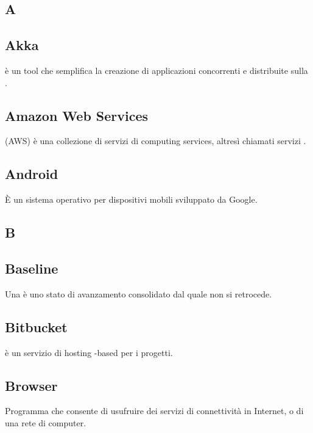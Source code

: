 \newpage

\begin{center}
\Huge\section*{\uppercase{A}}
\end{center}

\subsection*{Akka}
 è un tool  che semplifica la creazione di applicazioni concorrenti e distribuite sulla .

\subsection*{Amazon Web Services}
 (AWS) è una collezione di servizi di  computing services, altresì chiamati servizi .

\subsection*{Android}
È un sistema operativo  per dispositivi mobili sviluppato da Google.

\newpage

\begin{center}
\Huge\section*{\uppercase{B}}
\end{center}

\subsection*{Baseline}
Una  è uno stato di avanzamento consolidato dal quale non si retrocede. 

\subsection*{Bitbucket}
 è un servizio di hosting -based per i progetti.

\subsection*{Browser}
Programma che consente di usufruire dei servizi di connettività in Internet, o di una rete di computer.

